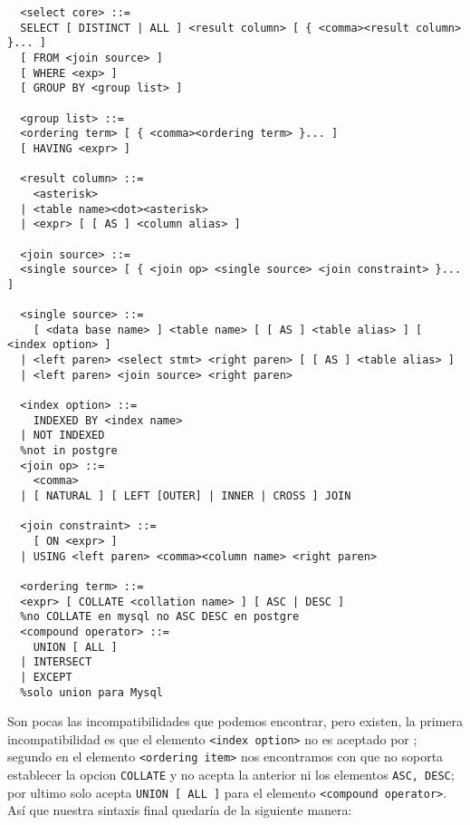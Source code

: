 \begin{Verbatim}
  <select core> ::=
  SELECT [ DISTINCT | ALL ] <result column> [ { <comma><result column> }... ] 
  [ FROM <join source> ]
  [ WHERE <exp> ]
  [ GROUP BY <group list> ]
  
  <group list> ::=
  <ordering term> [ { <comma><ordering term> }... ]
  [ HAVING <expr> ]
  
  <result column> ::=
    <asterisk>
  | <table name><dot><asterisk>
  | <expr> [ [ AS ] <column alias> ]
  
  <join source> ::=
  <single source> [ { <join op> <single source> <join constraint> }... ]
  
  <single source> ::=
    [ <data base name> ] <table name> [ [ AS ] <table alias> ] [ <index option> ]
  | <left paren> <select stmt> <right paren> [ [ AS ] <table alias> ]
  | <left paren> <join source> <right paren>
  
  <index option> ::=
    INDEXED BY <index name> 
  | NOT INDEXED
  %not in postgre
  <join op> ::=
    <comma>
  | [ NATURAL ] [ LEFT [OUTER] | INNER | CROSS ] JOIN
  
  <join constraint> ::=
    [ ON <expr> ]
  | USING <left paren> <comma><column name> <right paren>
  
  <ordering term> ::=
  <expr> [ COLLATE <collation name> ] [ ASC | DESC ]
  %no COLLATE en mysql no ASC DESC en postgre
  <compound operator> ::=
    UNION [ ALL ]
  | INTERSECT 
  | EXCEPT
  %solo union para Mysql
\end{Verbatim}
Son pocas las incompatibilidades que podemos encontrar, pero existen, la primera incompatibilidad es que el elemento \verb=<index option>= no es aceptado por \p; segundo en el elemento \verb=<ordering item>= nos encontramos con que \m no soporta establecer la opcion \verb=COLLATE= y \p no acepta la anterior ni los elementos \verb=ASC, DESC=; por ultimo \m solo acepta \verb=UNION [ ALL ]= para el elemento \verb=<compound operator>=. Así que nuestra sintaxis final quedaría de la siguiente manera:  

